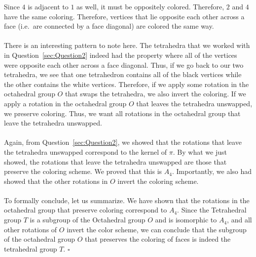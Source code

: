 \documentclass[letterpaper]{article}
\newcommand*{\QED}{\hfill\ensuremath{\square}}%
\begin{document}
Since $ 4 $ is adjacent to $ 1 $ as well, it must be oppositely colored.
Therefore, $ 2 $ and $ 4 $ have the same coloring.
Therefore, vertices that lie opposite each other across a face (i.e.\ are connected by a face diagonal) are colored the same way.
\\ \\
There is an interesting pattern to note here.
The tetrahedra that we worked with in Question~\ref{sec:Question2} indeed had the property where all of the vertices were opposite each other across a face diagonal.
Thus, if we go back to our two tetrahedra, we see that one tetrahedron contains all of the black vertices while the other contains the white vertices.
Therefore, if we apply some rotation in the octahedral group $ O $ that swaps the tetrahedra, we also invert the coloring.
If we apply a rotation in the octahedral group $ O $ that leaves the tetrahedra unswapped, we preserve coloring.
Thus, we want all rotations in the octahedral group that leave the tetrahedra unswapped.
\\ \\
Again, from Question~\ref{sec:Question2}, we showed that the rotations that leave the tetrahedra unswapped correspond to the kernel of $ \pi $.
By what we just showed, the rotations that leave the tetrahedra unswapped are those that preserve the coloring scheme.
We proved that this is $ A_4 $.
Importantly, we also had showed that the other rotations in $ O $ invert the coloring scheme.
\\ \\
To formally conclude, let us summarize.
We have shown that the rotations in the octahedral group that preserve coloring correspond to $ A_4 $.
Since the Tetrahedral group $ T $ is a subgroup of the Octahedral group $ O $ and is isomorphic to $ A_4 $, and all other rotations of $ O $ invert the color scheme, we can conclude that the subgroup of the octahedral group $ O $ that preserves the coloring of faces is indeed the tetrahedral group $ T $.
\QED{}
\end{document}
